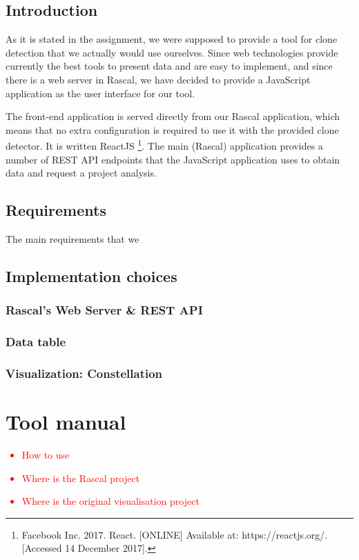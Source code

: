 \documentclass{uva-inf-article}
\newcommand\todo[1]{\textcolor{red}{#1}}
\begin{document}
\subsection{Introduction}
As it is stated in the assignment, we were supposed to provide a tool for clone detection that we actually would use ourselves.  Since web technologies provide currently the best tools to present data and are easy to implement, and since there is a web server in Rascal, we have decided to provide a JavaScript application as the user interface for our tool. 

The front-end application is served directly from our Rascal application, which means that no extra configuration is required to use it with the provided clone detector. It is written ReactJS \footnote{Facebook Inc. 2017. React. [ONLINE] Available at: https://reactjs.org/. [Accessed 14 December 2017].
}. The main (Rascal) application provides a number of REST API endpoints that the JavaScript application uses to obtain data and request a project analysis. 

\subsection{Requirements}
The main requirements that we 

\subsection{Implementation choices}

\subsubsection{Rascal's Web Server \& REST API}

\subsubsection{Data table}

\subsubsection{Visualization: Constellation}

\section{Tool manual}
\todo {
	\begin{itemize}
		\item{How to use}
		\item{Where is the Rascal project}
		\item{Where is the original visualisation project }
	\end{itemize}
}
\end{document}
